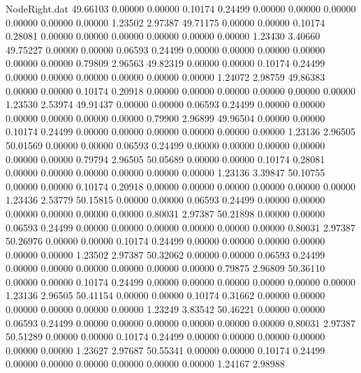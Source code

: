 \begin{filecontents}{NodeRight.dat}
  49.66103    0.00000    0.00000     0.10174    0.24499    0.00000    0.00000    0.00000    0.00000    0.00000    0.00000    1.23502    2.97387
  49.71175    0.00000    0.00000     0.10174    0.28081    0.00000    0.00000    0.00000    0.00000    0.00000    0.00000    1.23430    3.40660
  49.75227    0.00000    0.00000     0.06593    0.24499    0.00000    0.00000    0.00000    0.00000    0.00000    0.00000    0.79809    2.96563
  49.82319    0.00000    0.00000     0.10174    0.24499    0.00000    0.00000    0.00000    0.00000    0.00000    0.00000    1.24072    2.98759
  49.86383    0.00000    0.00000     0.10174    0.20918    0.00000    0.00000    0.00000    0.00000    0.00000    0.00000    1.23530    2.53974
  49.91437    0.00000    0.00000     0.06593    0.24499    0.00000    0.00000    0.00000    0.00000    0.00000    0.00000    0.79900    2.96899
  49.96504    0.00000    0.00000     0.10174    0.24499    0.00000    0.00000    0.00000    0.00000    0.00000    0.00000    1.23136    2.96505
  50.01569    0.00000    0.00000     0.06593    0.24499    0.00000    0.00000    0.00000    0.00000    0.00000    0.00000    0.79794    2.96505
  50.05689    0.00000    0.00000     0.10174    0.28081    0.00000    0.00000    0.00000    0.00000    0.00000    0.00000    1.23136    3.39847
  50.10755    0.00000    0.00000     0.10174    0.20918    0.00000    0.00000    0.00000    0.00000    0.00000    0.00000    1.23436    2.53779
  50.15815    0.00000    0.00000     0.06593    0.24499    0.00000    0.00000    0.00000    0.00000    0.00000    0.00000    0.80031    2.97387
  50.21898    0.00000    0.00000     0.06593    0.24499    0.00000    0.00000    0.00000    0.00000    0.00000    0.00000    0.80031    2.97387
  50.26976    0.00000    0.00000     0.10174    0.24499    0.00000    0.00000    0.00000    0.00000    0.00000    0.00000    1.23502    2.97387
  50.32062    0.00000    0.00000     0.06593    0.24499    0.00000    0.00000    0.00000    0.00000    0.00000    0.00000    0.79875    2.96809
  50.36110    0.00000    0.00000     0.10174    0.24499    0.00000    0.00000    0.00000    0.00000    0.00000    0.00000    1.23136    2.96505
  50.41154    0.00000    0.00000     0.10174    0.31662    0.00000    0.00000    0.00000    0.00000    0.00000    0.00000    1.23249    3.83542
  50.46221    0.00000    0.00000     0.06593    0.24499    0.00000    0.00000    0.00000    0.00000    0.00000    0.00000    0.80031    2.97387
  50.51289    0.00000    0.00000     0.10174    0.24499    0.00000    0.00000    0.00000    0.00000    0.00000    0.00000    1.23627    2.97687
  50.55341    0.00000    0.00000     0.10174    0.24499    0.00000    0.00000    0.00000    0.00000    0.00000    0.00000    1.24167    2.98988

\end{filecontents}
